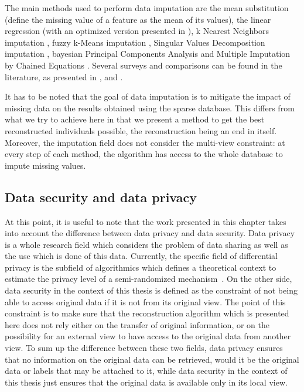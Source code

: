 The main methods used to perform data imputation are the mean substitution
(define the missing value of a feature as the mean of its values), the
linear regression (with an optimized version presented in
\cite{resheff2015optimized}), k Nearest Neighbors imputation 
\cite{troyanskaya2001missing}, fuzzy k-Means imputation \cite{li2004towards}, 
Singular Values Decomposition imputation \cite{troyanskaya2001missing}, bayesian 
Principal Components Analysis \cite{oba2003bayesian} and Multiple Imputation by 
Chained Equations \cite{oba2003bayesian}. Several surveys and comparisons can be 
found in the literature, as presented in \cite{schmitt2015comparison}, 
\cite{rubin2004multiple} and \cite{van2018flexible}.

It has to be noted that the goal of data imputation is to mitigate the
impact of missing data on the results obtained using the sparse database. This
differs from what we try to achieve here in that we present a method to get the
best reconstructed individuals possible, the reconstruction being an end in
itself.  Moreover, the imputation field does not consider the multi-view
constraint: at every step of each method, the algorithm has access to
the whole database to impute missing values.

\subsection{Data security and data privacy}
At this point, it is useful to note that the work presented in this chapter takes into account the difference between data privacy and data security. Data privacy is a whole research field which considers the problem of data sharing as well as the use which is done of this data. Currently, the specific field of differential privacy is the subfield of algorithmics which defines a theoretical context to estimate the privacy level of a semi-randomized mechanism~\cite{dwork2010differential}. On the other side, data security in the context of this thesis is defined as the constraint of not being able to access original data if it is not from its original view. The point of this constraint is to make sure that the reconstruction algorithm which is presented here does not rely either on the transfer of original information, or on the possibility for an external view to have access to the original data from another view. To sum up the difference between these two fields, data privacy ensures that no information on the original data can be retrieved, would it be the original data or labels that may be attached to it, while data security in the context of this thesis just ensures that the original data is available only in its local view.

